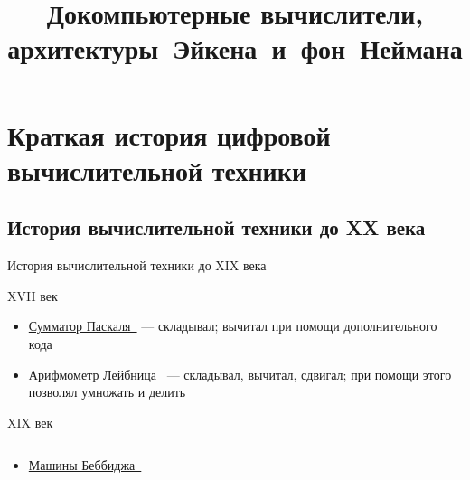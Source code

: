 \documentclass[xetex,aspectratio=43]{beamer}
\title[Докомпьютерные, Эйкен, фон Нейман]{Докомпьютерные вычислители, архитектуры~Эйкена~и~фон~Неймана}
\begin{document}
\titleslide

\tocslide

\section{Краткая история цифровой
		вычислительной техники}

\subsection{История вычислительной техники до XX века}

\begin{frame}{История вычислительной техники до XIX века}
	\begin{block}{XVII век}
		\begin{itemize}
			\item
			\href{https://en.wikipedia.org/wiki/Pascal\%27s_calculator\#Addition}{Сумматор
				Паскаля~\extlink} --- складывал; вычитал при помощи дополнительного кода
			\item
			\href{https://en.wikipedia.org/wiki/Stepped_reckoner\#Operation}{Арифмометр
				Лейбница~\extlink} --- складывал, вычитал, сдвигал; при помощи этого позволял
			умножать и делить
		\end{itemize}
	\end{block}

	\pause

	\begin{block}{XIX век}
		\begin{columns}
		\begin{column}{0.7\textwidth}
			\begin{itemize}
				\item
				\href{https://en.wikipedia.org/wiki/Charles_Babbage\#Computing_pioneer}{Машины
					Беббиджа~\extlink}
	

\end{itemize}
\end{column}
\end{columns}
\end{block}
\end{frame}
\end{document}
